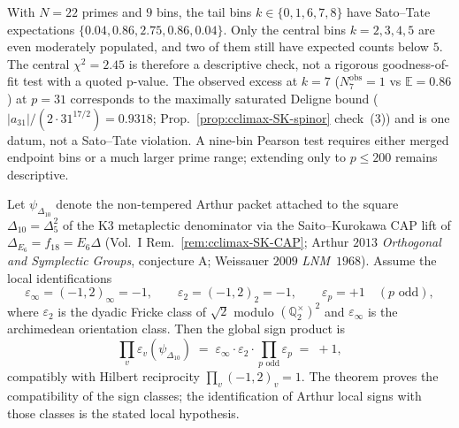 \begin{remark}
\label{rem:stqp-chi2-scope}
With $N = 22$ primes and $9$ bins, the tail bins $k \in \{0, 1,
6, 7, 8\}$ have Sato--Tate expectations $\{0.04, 0.86, 2.75,
0.86, 0.04\}$. Only the central bins $k = 2, 3, 4, 5$ are even
moderately populated, and two of them still have expected counts
below $5$. The central $\chi^2 = 2.45$ is therefore a descriptive
check, not a rigorous goodness-of-fit test with a quoted p-value.
The observed excess at $k = 7$
($N_7^{\mathrm{obs}} = 1$ vs $\mathbb E = 0.86$) at $p = 31$
corresponds to the maximally saturated Deligne bound
($|a_{31}|/(2\cdot 31^{17/2}) = 0.9318$; Prop.~\ref{prop:cclimax-SK-spinor}
check~(3)) and is one datum, not a Sato--Tate violation. A nine-bin
Pearson test requires either merged endpoint bins or a much larger
prime range; extending only to $p\le 200$ remains descriptive.
\end{remark}

\begin{theorem}
\label{thm:stqp-archimedean-sign}
%
%
%
Let $\psi_{\Delta_{10}}$ denote the non-tempered Arthur packet
attached to the square $\Delta_{10}=\Delta_5^2$ of the K3
metaplectic denominator via the Saito--Kurokawa CAP lift of
$\Delta_{E_6} = f_{18}=E_6\Delta$ (Vol.~I
Rem.~\ref{rem:cclimax-SK-CAP}; Arthur $2013$
\emph{Orthogonal and Symplectic Groups}, conjecture A;
Weissauer $2009$ \emph{LNM}~$1968$). Assume the local
identifications
\[
\varepsilon_\infty=(-1,2)_\infty=-1,\qquad
\varepsilon_2=(-1,2)_2=-1,\qquad
\varepsilon_p=+1\quad(p\text{ odd}),
\]
where $\varepsilon_2$ is the dyadic Fricke class of $\sqrt2$
modulo $(\mathbb Q_2^\times)^2$ and $\varepsilon_\infty$ is the
archimedean orientation class. Then the global sign product is
\[
\prod_v \varepsilon_v(\psi_{\Delta_{10}})
\;=\;
\varepsilon_\infty \cdot \varepsilon_2 \cdot
\prod_{p \text{ odd}} \varepsilon_p
\;=\;
+1,
\]
compatibly with Hilbert reciprocity $\prod_v(-1,2)_v=1$. The
theorem proves the compatibility of the sign classes; the
identification of Arthur local signs with those classes is the
stated local hypothesis.
\end{theorem}

